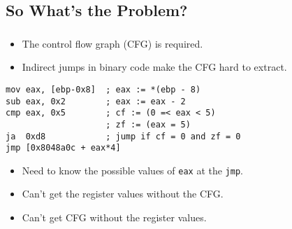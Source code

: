 \documentclass[compress]{beamer}
\begin{document}
\subsection{So What's the Problem?}
\begin{frame}[fragile]
	\frametitle{\insertsubsection}

	\begin{itemize}
		\item The control flow graph (CFG) is required.
		\item Indirect jumps in binary code make the CFG hard to extract.
	\end{itemize}

	\vfill

\begin{lstlisting}
mov eax, [ebp-0x8]  ; eax := *(ebp - 8)
sub eax, 0x2        ; eax := eax - 2
cmp eax, 0x5        ; cf := (0 =< eax < 5)
                    ; zf := (eax = 5)
ja  0xd8            ; jump if cf = 0 and zf = 0
jmp [0x8048a0c + eax*4]
\end{lstlisting}
\vfill

	\begin{itemize}
	\item Need to know the possible values of \texttt{eax} at the \texttt{jmp}.
	\item Can't get the register values without the CFG.
	\item Can't get CFG without the register values.
	\end{itemize}
\vfill
\end{frame}
\end{document}
